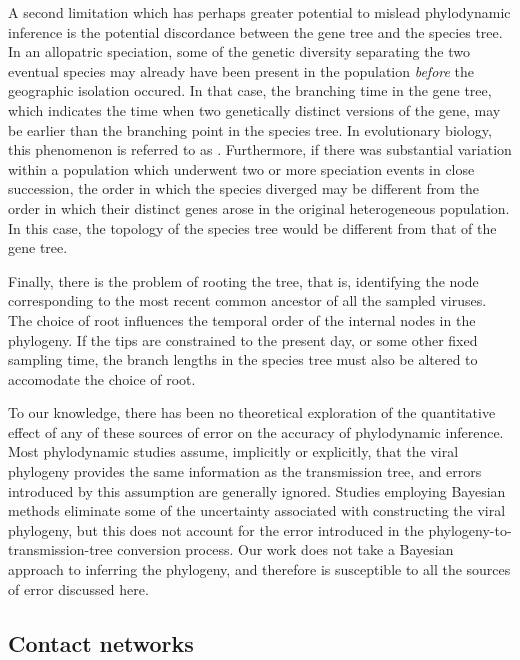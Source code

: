 A second limitation which has perhaps greater potential to mislead phylodynamic
inference is the potential discordance between the gene tree and the species
tree. In an allopatric speciation, some of the genetic diversity separating the
two eventual species may already have been present in the population
\emph{before} the geographic isolation occured. In that case, the branching
time in the gene tree, which indicates the time when two genetically distinct
versions of the gene, may be earlier than the branching point in the species
tree. In evolutionary biology, this phenomenon is referred to as
. Furthermore, if there was substantial
variation within a population which underwent two or more speciation events in
close succession, the order in which the species diverged may be different from
the order in which their distinct genes arose in the original heterogeneous
population. In this case, the topology of the species tree would be different
from that of the gene tree. 

Finally, there is the problem of rooting the tree, that is, identifying the
node corresponding to the most recent common ancestor of all the sampled
viruses. The choice of root influences the temporal order of the internal
nodes in the phylogeny. If the tips are constrained to the present day, or some
other fixed sampling time, the branch lengths in the species tree must also be
altered to accomodate the choice of root. 

To our knowledge, there has been no theoretical exploration of the quantitative
effect of any of these sources of error on the accuracy of phylodynamic
inference. Most phylodynamic studies assume, implicitly or explicitly, that the
viral phylogeny provides the same information as the transmission tree, and
errors introduced by this assumption are generally ignored. Studies employing
Bayesian methods eliminate some of the uncertainty associated with constructing
the viral phylogeny, but this does not account for the error introduced in the
phylogeny-to-transmission-tree conversion process. Our work does not take a
Bayesian approach to inferring the phylogeny, and therefore is susceptible to
all the sources of error discussed here.

\subsection{Contact networks}

